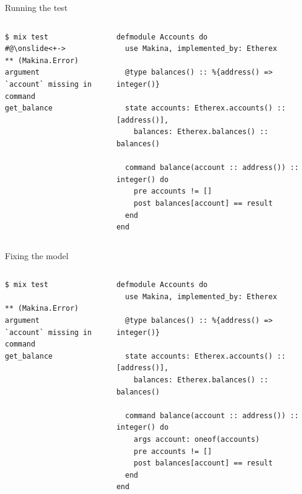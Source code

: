 \documentclass[aspectratio=169, 10pt, handout]{beamer}
\begin{document}
\begin{frame}[label={sec:orgbb4b17c},fragile]{Running the test}
 \begin{columns}
\begin{column}{0.28\columnwidth}
\onslide<+->
\lstset{language=bash,label= ,caption= ,captionpos=b,numbers=none,style=shell}
\begin{lstlisting}
$ mix test
#@\onslide<+->
** (Makina.Error) argument
`account` missing in command
get_balance
\end{lstlisting}
\vspace{40pt}
\end{column}

\begin{column}{0.58\columnwidth}
\lstset{language=elixir,label= ,caption= ,captionpos=b,numbers=none,style=display}
\begin{lstlisting}
defmodule Accounts do
  use Makina, implemented_by: Etherex

  @type balances() :: %{address() => integer()}

  state accounts: Etherex.accounts() :: [address()],
	balances: Etherex.balances() :: balances()

  command balance(account :: address()) :: integer() do
    pre accounts != []
    post balances[account] == result
  end
end
\end{lstlisting}
\end{column}
\end{columns}
\end{frame}

\begin{frame}[label={sec:org29f7e61},fragile]{Fixing the model}
 \begin{columns}
\begin{column}{0.28\columnwidth}
\onslide<+->
\lstset{language=bash,label= ,caption= ,captionpos=b,numbers=none,style=shell}
\begin{lstlisting}
$ mix test

** (Makina.Error) argument
`account` missing in command
get_balance
\end{lstlisting}
\vspace{40pt}
\end{column}

\begin{column}{0.58\columnwidth}
\lstset{language=elixir,label= ,caption= ,captionpos=b,numbers=none,style=display}
\begin{lstlisting}
defmodule Accounts do
  use Makina, implemented_by: Etherex

  @type balances() :: %{address() => integer()}

  state accounts: Etherex.accounts() :: [address()],
	balances: Etherex.balances() :: balances()

  command balance(account :: address()) :: integer() do
    args account: oneof(accounts)
    pre accounts != []
    post balances[account] == result
  end
end
\end{lstlisting}
\end{column}
\end{columns}
\end{frame}
\end{document}
